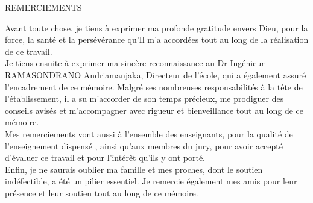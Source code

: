 \documentclass[a4paper,12pt, oneside]{article}
\begin{document}
\thispagestyle{empty}
\vspace*{\fill}
\newpage


\begin{center}
\LARGE{REMERCIEMENTS}
\end{center}

Avant toute chose, je tiens à exprimer ma profonde gratitude envers Dieu, pour la force, la santé et la persévérance qu'Il m'a accordées tout au long de la réalisation de ce travail.\\

Je tiens ensuite à exprimer ma sincère reconnaissance au Dr Ingénieur RAMASONDRANO Andriamanjaka, Directeur de l'école, qui a également assuré l'encadrement de ce mémoire. Malgré ses nombreuses responsabilités à la tête de l'établissement, il a su m'accorder de son temps précieux, me prodiguer des conseils avisés et m'accompagner avec rigueur et bienveillance tout au long de ce mémoire.\\

Mes remerciements vont aussi à l'ensemble des enseignants, pour la qualité de l'enseignement dispensé , ainsi qu'aux membres du jury, pour avoir accepté d'évaluer ce travail et pour l'intérêt qu'ils y ont porté.\\

Enfin, je ne saurais oublier ma famille et mes proches, dont le soutien indéfectible, a été un pilier essentiel. Je remercie également mes amis pour leur présence et leur soutien tout au long de ce mémoire.\\
\end{document}
